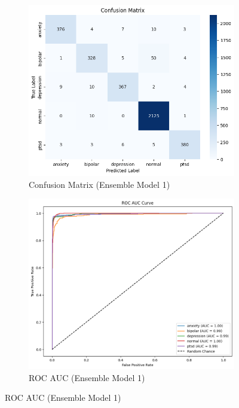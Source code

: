 \begin{figure}[h!]
    \centering
    \begin{subfigure}[b]{0.47\textwidth}
        \centering
        \includegraphics[width=\textwidth]{Images/EM CM.png}
        \caption*{Confusion Matrix (Ensemble Model 1)}
        \label{dfdl3123}  %
    \end{subfigure}
    \hfill
    \begin{subfigure}[b]{0.47\textwidth}
        \centering
        \includegraphics[width=\textwidth]{Images/EM ROC.png}
        \caption*{ROC AUC (Ensemble Model 1)}
        \label{dfdl12443}  %
    \end{subfigure}
    \label{fig:ensemble_model_comparison}
\end{figure}

